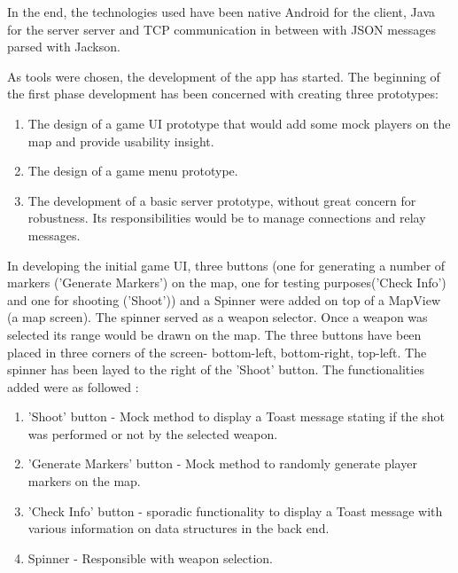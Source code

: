 In the end, the technologies used have been native Android for the
client, Java for the server server and TCP communication in between with JSON
messages parsed with Jackson. \newline

As tools were chosen, the development of the app has started.
The beginning of the first phase development has been concerned with creating
three prototypes:

\begin{enumerate}
  \item The design of a game UI prototype that would add some mock players on
  the map and provide usability insight.
  
  \item The design of a game menu prototype.
  
  \item The development of a basic server prototype, without great concern for
  robustness. Its responsibilities would be to manage connections and relay
  messages.
  
\end{enumerate}

In developing the initial game UI, three buttons (one for
generating a number of markers ('Generate Markers') on the map, one for testing
purposes('Check Info') and one for shooting ('Shoot')) and a Spinner were added
on top of a MapView (a map screen). The spinner served as a weapon selector.
Once a weapon was selected its range would be drawn on the map. The three
buttons have been placed in three corners of the screen- bottom-left,
bottom-right, top-left. The spinner has been layed to the right of the 'Shoot'
button. The functionalities added were as followed :

\begin{enumerate}
  \item 'Shoot' button - Mock method to display a Toast message stating if the
  shot was performed or not by the selected weapon.
  
  \item 'Generate Markers' button - Mock method to randomly generate
  player markers on the map.
  
  \item 'Check Info' button - sporadic functionality to display a Toast message
  with various information on data structures in the back end.
  
  \item Spinner - Responsible with weapon selection. 
\end{enumerate}


